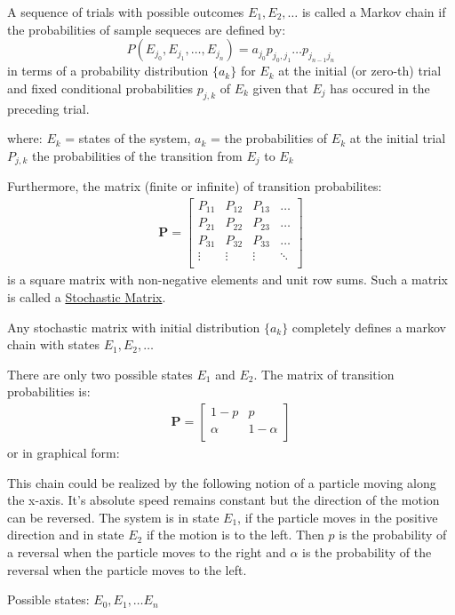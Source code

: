 
\begin{definition}
A sequence of trials with possible outcomes $E_1, E_2, \dots$ is called a Markov chain if the probabilities of sample sequeces are defined by: 
$$ P(E_{j_0}, E_{j_1}, \dots , E_{j_n}) = a_{j_0}p_{j_0, j_1} \dots p_{j_{n-1} j_n}$$ in terms of a probability distribution $\{a_k\}$ for $E_k$ at the initial (or zero-th) trial and fixed conditional probabilities $p_{j, k}$ of $E_k$ given that $E_j$ has occured in the preceding trial.
\end{definition}
where: $E_k$ = states of the system, $a_k$ = the probabilities of $E_k$ at the initial trial $P_{j, k}$ the probabilities of the transition from $E_j$ to $E_k$

Furthermore, the matrix (finite or infinite) of transition probabilites: 
\begin{align*}
    \mathbf{P} = \begin{bmatrix} 
                    P_{11} & P_{12} & P_{13} & \dots \\
                    P_{21} & P_{22} & P_{23} & \dots \\
                    P_{31} & P_{32} & P_{33} & \dots \\
                    \vdots & \vdots & \vdots & \ddots \\
                \end{bmatrix}
\end{align*}
is a square matrix with non-negative elements and unit row sums. Such a matrix is called a \underline{Stochastic Matrix}.

Any stochastic matrix with initial distribution $\{a_k\}$ completely defines a markov chain with states $E_1, E_2, \dots$

\begin{example}
There are only two possible states $E_1$ and $E_2$. The matrix of transition probabilities is: 
\begin{align}
    \mathbf{P} = \begin{bmatrix} 
                 1 - p & p \\
                 \alpha & 1 - \alpha \\
                 \end{bmatrix}
\end{align}
or in graphical form: 
\end{example}

\begin{remark}
This chain could be realized by the following notion of a particle moving along the x-axis. 
It's absolute speed remains constant but the direction of the motion can be reversed. 
The system is in state $E_1$, if the particle moves in the positive direction and in state $E_2$ if the motion is to the left.
Then $p$ is the probability of a reversal when the particle moves to the right and $\alpha$ is the probability of the reversal when the particle moves to the left.
\end{remark}

\begin{example}
Possible states: $E_0, E_1, \dots E_n$


\end{example}